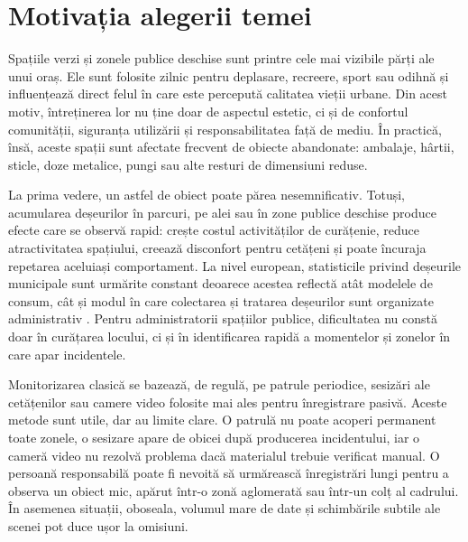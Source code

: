 
\section*{Motivația alegerii temei}
{}

Spațiile verzi și zonele publice deschise sunt printre cele mai vizibile părți ale unui oraș. Ele sunt folosite zilnic pentru deplasare, recreere, sport sau odihnă și influențează direct felul în care este percepută calitatea vieții urbane. Din acest motiv, întreținerea lor nu ține doar de aspectul estetic, ci și de confortul comunității, siguranța utilizării și responsabilitatea față de mediu. În practică, însă, aceste spații sunt afectate frecvent de obiecte abandonate: ambalaje, hârtii, sticle, doze metalice, pungi sau alte resturi de dimensiuni reduse.

La prima vedere, un astfel de obiect poate părea nesemnificativ. Totuși, acumularea deșeurilor în parcuri, pe alei sau în zone publice deschise produce efecte care se observă rapid: crește costul activităților de curățenie, reduce atractivitatea spațiului, creează disconfort pentru cetățeni și poate încuraja repetarea aceluiași comportament. La nivel european, statisticile privind deșeurile municipale sunt urmărite constant deoarece acestea reflectă atât modelele de consum, cât și modul în care colectarea și tratarea deșeurilor sunt organizate administrativ \cite{eurostat2026municipal}. Pentru administratorii spațiilor publice, dificultatea nu constă doar în curățarea locului, ci și în identificarea rapidă a momentelor și zonelor în care apar incidentele.

Monitorizarea clasică se bazează, de regulă, pe patrule periodice, sesizări ale cetățenilor sau camere video folosite mai ales pentru înregistrare pasivă. Aceste metode sunt utile, dar au limite clare. O patrulă nu poate acoperi permanent toate zonele, o sesizare apare de obicei după producerea incidentului, iar o cameră video nu rezolvă problema dacă materialul trebuie verificat manual. O persoană responsabilă poate fi nevoită să urmărească înregistrări lungi pentru a observa un obiect mic, apărut într-o zonă aglomerată sau într-un colț al cadrului. În asemenea situații, oboseala, volumul mare de date și schimbările subtile ale scenei pot duce ușor la omisiuni.

